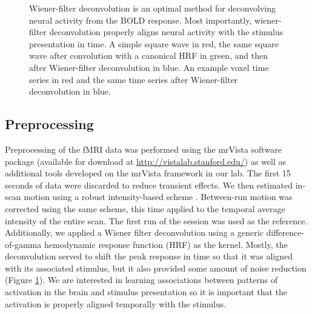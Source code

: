 \documentclass[preprint,5p,authoryear]{elsarticle}
\begin{document}
\begin{figure}
\begin{subfigure}{0.4\textwidth}
\caption{}
\label{fig:wiener-voxel}
\end{subfigure}
\caption{
Wiener-filter deconvolution is an optimal method for deconvolving neural activity from the BOLD response.
Most importantly, wiener-filter deconvolution properly aligns neural activity with the stimulus presentation in time.
 A simple square wave in red, the same square wave after convolution with a canonical HRF in green, and then after Wiener-filter deconvolution in blue. 
 An example voxel time series in red and the same time series after Wiener-filter deconvolution in blue.}
\label{fig:wiener-deconvolution}
\end{figure}

\subsection{Preprocessing}
Preprocessing of the fMRI data was performed using the mrVista software package (available for download at \url{http://vistalab.stanford.edu/}) as well as additional tools developed on the mrVista framework in our lab. 
The first 15 seconds of data  were discarded to reduce transient effects.
We then estimated in-scan motion using a robust intensity-based scheme \citep{Nestares2000}. 
Between-run motion was corrected using the same scheme, this time applied to the temporal average intensity of the entire scan. 
The first run of the session was used as the reference. 
Additionally, we applied a Wiener filter deconvolution \citep{Poor1980} using a generic difference-of-gamma hemodynamic response function (HRF) \citep{Glover1999} as the kernel.
Mostly, the deconvolution served to shift the peak response in time so that it was aligned with its associated stimulus, but it also provided some amount of noise reduction (Figure \ref{fig:wiener-voxel}).
We are interested in learning associations between patterns of activation in the brain and stimulus presentation so it is important that the activation is properly aligned temporally with the stimulus.
\end{document}
